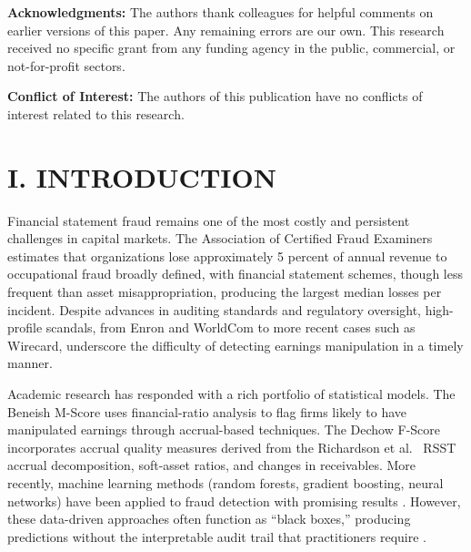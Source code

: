 \documentclass[12pt]{article}
\begin{document}
\medskip
\noindent\textbf{Acknowledgments:}
The authors thank colleagues for helpful comments on earlier versions
of this paper.  Any remaining errors are our own.  This research
received no specific grant from any funding agency in the public,
commercial, or not-for-profit sectors.

\medskip
\noindent\textbf{Conflict of Interest:}
The authors of this publication have no conflicts of interest related
to this research.

\linenumbers
\section*{\centering I. INTRODUCTION}
\label{sec:intro}

Financial statement fraud remains one of the most costly and persistent
challenges in capital markets.  The Association of Certified Fraud
Examiners \citep{acfe2024} estimates that organizations lose approximately
5 percent of annual revenue to occupational fraud broadly defined, with
financial statement schemes, though less frequent than asset
misappropriation, producing the largest median losses per incident.  Despite
advances in auditing standards and regulatory oversight, high-profile
scandals, from Enron and WorldCom to more recent cases such as
Wirecard, underscore the difficulty of detecting earnings manipulation in a
timely manner.

Academic research has responded with a rich portfolio of statistical models.
The Beneish M-Score \citep{beneish1999} uses financial-ratio analysis to flag
firms likely to have manipulated earnings through accrual-based techniques.
The Dechow F-Score \citep{dechow2011} incorporates accrual quality measures
derived from the Richardson et al.\ \citep{richardson2005} RSST accrual
decomposition, soft-asset ratios, and changes in receivables.  More recently,
machine learning methods (random forests, gradient boosting, neural
networks) have been applied to fraud detection with promising results
\citep{bao2020,cecchini2010,craja2020}.  However, these data-driven
approaches often function as ``black boxes,'' producing predictions without the
interpretable audit trail that practitioners require \citep{green1997}.
\end{document}
